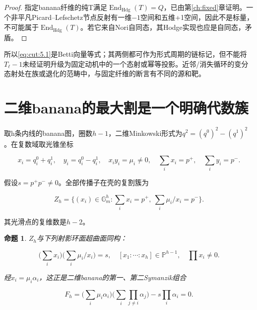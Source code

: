 \documentclass[11pt,a4paper,oneside]{ctexrep}
\theoremstyle{cnplain}
\newtheorem{proposition}[theorem]{命题}
\theoremstyle{definition}
\theoremstyle{remark}
\begin{document}
\begin{proof}

指定banana纤维的纯T满足\(\operatorname{End}_{\mathrm{Hdg}}(T)=Q\)，已由第\ref{ch:fixed}章证明。一个非平凡Picard--Lefschetz节点反射有一维\(- 1\)空间和五维+1空间，因此不是标量，不可能属于\(\operatorname{End}_{\mathrm{Hdg}}(T)\)。若它来自Nori自同态，其Hodge实现也应是自同态，矛盾。

\end{proof}

所以\eqref{eq:cut:5.1}是Betti向量等式；其两侧都可作为形式周期的链标记，但不能将\(T_\ell - 1\)未经证明升级为固定动机中的一个态射或幂等投影。近邻/消失循环的变分态射处在族或退化的范畴中，与固定纤维的断言有不同的源和靶。

\section{二维banana的最大割是一个明确代数簇}\label{sec:cut:6}

取h条内线的banana图，圈数\(h- 1\)，二维Minkowski形式为\(q^{2}=(q^{0})^{2}- (q^{1})^{2}\)。在复数域取光锥坐标

\begin{equation}
x_i=q_i^0+q_i^1,\quad y_i=q_i^0-q_i^1,
 \quad x_iy_i=\mu_i\ne0,
 \quad\sum_i x_i=p^+,\quad\sum_i y_i=p^-.
\end{equation}

假设\(s=p^+p^-\ne 0\)。全部传播子在壳的复割簇为

\begin{equation}
Z_h=\{(x_i)\in\mathbb G_m^h:
             \sum_i x_i=p^+,\ \sum_i\mu_i/x_i=p^-\}.   \label{eq:cut:6.1}
\end{equation}

其光滑点的复维数是\(h- 2\)。

\begin{proposition}

\label{thm:cut:6.1} \(Z_h\)与下列射影环面超曲面同构：

\begin{equation}
\Big(\sum_i x_i\Big)\Big(\sum_i\mu_i/x_i\Big)=s,
 \quad[x_1:\cdots:x_h]\in\mathbb P^{h-1},\quad\prod x_i\ne0.
                                                               \label{eq:cut:6.2}
\end{equation}

经\(x_i=\mu _i\alpha _i\)，这正是二维banana的第一、第二Symanzik组合

\begin{equation}
F_h=\Big(\sum_i\mu_i\alpha_i\Big)
               \Big(\sum_i\prod_{j\ne i}\alpha_j\Big)
                      -s\prod_i\alpha_i=0.             \label{eq:cut:6.3}
\end{equation}

\end{proposition}
\end{document}
